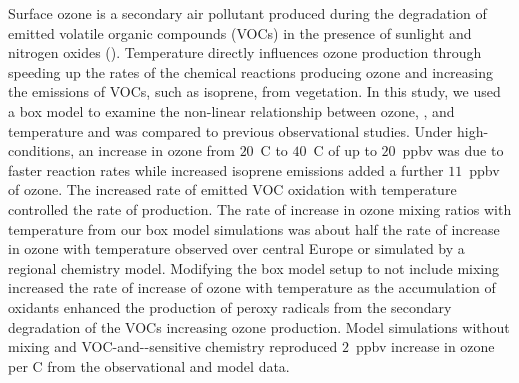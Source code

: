 Surface ozone is a secondary air pollutant produced during the degradation of emitted volatile organic compounds (VOCs) in the presence of sunlight and nitrogen oxides (). 
Temperature directly influences ozone production through speeding up the rates of the chemical reactions producing ozone and increasing the emissions of VOCs, such as isoprene, from vegetation.
In this study, we used a box model to examine the non-linear relationship between ozone, , and temperature and was compared to previous observational studies.
Under high- conditions, an increase in ozone from $20$~\degree C to $40$~\degree C of up to $20$~ppbv was due to faster reaction rates while increased isoprene emissions added a further $11$~ppbv of ozone.
The increased rate of emitted VOC oxidation with temperature controlled the rate of  production.
The rate of increase in ozone mixing ratios with temperature from our box model simulations was about half the rate of increase in ozone with temperature observed over central Europe or simulated by a regional chemistry model.
Modifying the box model setup to not include mixing increased the rate of increase of ozone with temperature as the accumulation of oxidants enhanced the production of peroxy radicals from the secondary degradation of the VOCs increasing ozone production.
Model simulations without mixing and VOC-and--sensitive chemistry reproduced $2$~ppbv increase in ozone per \degree C from the observational and model data.
